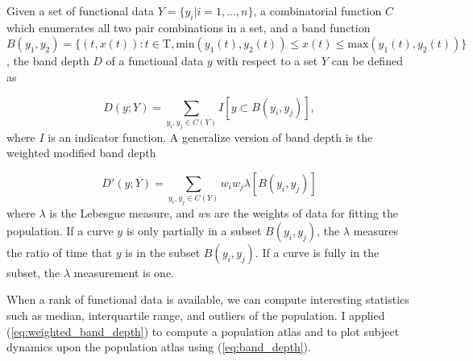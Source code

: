 Given a set of functional data $Y=\{y_i | i=1,...,n\}$, a combinatorial function $C$ which enumerates all two pair combinations in a set, and a band function $B(y_1, y_2) = \{(t,x(t)): t\in \mathrm{T}, \mathrm{min}(y_1(t),y_2(t)) \leq x(t) \leq \mathrm{max}(y_1(t),y_2(t))\}$,
the band depth $D$ of a functional data $y$ with respect to a set $Y$ can be defined as

\begin{equation}
D(y; Y) = \sum_{y_i, y_j \in C(Y)} I[y \subset B(y_i, y_j)],
\label{eq:band_depth}
\end{equation}
where $I$ is an indicator function.
A generalize version of band depth is the weighted modified band depth

\begin{equation}
D'(y; Y) = \sum_{y_i, y_j \in C(Y)} w_iw_j\lambda[ B(y_i, y_j) ]
\label{eq:weighted_band_depth}
\end{equation}
where $\lambda$ is the Lebesgue measure, and $w$s are the weights of data for fitting the population.
If a curve $y$ is only partially in a subset $B(y_i,y_j)$, the $\lambda$ measures the ratio of time that $y$ is in the subset $B(y_i,y_j)$.
If a curve is fully in the subset, the $\lambda$ measurement is one.

When a rank of functional data is available, we can compute interesting statistics such as median, interquartile range, and outliers of the population.
I applied (\ref{eq:weighted_band_depth}) to compute a population atlas and to plot subject dynamics upon the population atlas using (\ref{eq:band_depth}).
